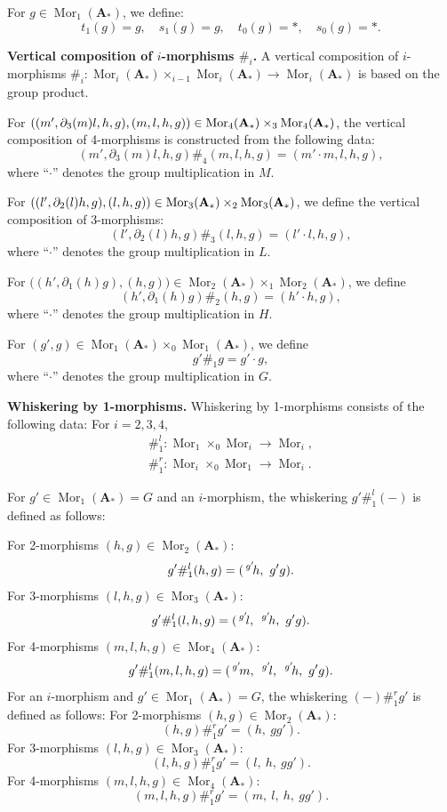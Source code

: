 \documentclass[11pt, reqno]{amsart} %
\newcommand{\act}[1]{\,\sp{#1}\!}
\newcommand{\mor}{{\mathop{\mathrm{Mor}}}}
\theoremstyle{definition}
\theoremstyle{remark}
\numberwithin{equation}{section}
\begin{document}
For $g \in \mor_1(\mathbf{A}_*)$, we define:
\begin{equation*}
t_1(g) = g, \quad s_1(g) = g, \quad t_0(g) = *, \quad s_0(g) = *.
\end{equation*}

\vspace{.5em}
\noindent
{\bf Vertical composition of $i$-morphisms $\#_i$.}
 A vertical composition of $i$-morphisms $\#_i : \mor_i(\mathbf{A}_*)\allowbreak \times_{i-1} \mor_i(\mathbf{A}_*)  \rightarrow \mor_i(\mathbf{A}_*) $ is based on the group product.

For $ \left( (m', \partial_3(m) l,h,g) , (m,l,h,g) \right) \in \mor_4({\bf A_*}) \times_3 \mor_4({\bf A_*})$, the vertical composition of 4-morphisms is constructed from the following data:
\[
(m', \partial_3(m) l,h,g) \#_4 (m,l,h,g) = (m' \cdot m,l,h,g),
\]
where ``$\cdot$'' denotes the group multiplication in $M$.

For $ \left( ( l',\partial_2(l)h,g) , (l,h,g) \right) \in \mor_3({\bf A_*}) \times_2 \mor_3({\bf A_*})$, we define the vertical composition of 3-morphisms:
\[
( l',\partial_2(l)h,g) \#_3 ( l,h,g) = (l'\cdot l,h,g),
\]
where ``$\cdot$'' denotes the group multiplication in $L$.

For $\big((h', \partial_1(h)g), (h, g)\big) \in \mor_2(\mathbf{A_*}) \times_1 \mor_2(\mathbf{A_*})$, we define
\[
(h', \partial_1(h)g) \#_2 (h, g) = (h' \cdot h, g),
\]
where ``$\cdot$'' denotes the group multiplication in $H$.

For $(g', g) \in \mor_1(\mathbf{A_*}) \times_0 \mor_1(\mathbf{A_*})$, we define
\[
g' \#_1 g = g' \cdot g,
\]
where ``$\cdot$'' denotes the group multiplication in $G$.

\vspace{.5em}
\noindent
{\bf Whiskering by 1-morphisms.}
Whiskering by 1-morphisms consists of the following data:
For $i = 2,3,4$,
\begin{equation*}
\begin{aligned}
\#^l_1: \mor_1 \times_0 \mor_i \rightarrow \mor_i,\\
\#^r_1: \mor_i \times_0 \mor_1 \rightarrow \mor_i.
\end{aligned}
\end{equation*}

For $g' \in \mor_1(\mathbf{A_*}) = G$ and an $i$-morphism, the whiskering $g' \#^l_1 (-)$ is defined as follows:

For 2-morphisms $(h, g) \in \mor_2(\mathbf{A_*})$:
$$
g' \#^l_1 (h, g) = (\act{g'}{}{h},\ g'g).
$$
For 3-morphisms $(l, h, g) \in \mor_3(\mathbf{A_*})$:
$$
g' \#^l_1 (l, h, g) = (\act{g'}{}{l},\ \act{g'}{}{h},\ g'g).
$$
For 4-morphisms $(m, l, h, g) \in \mor_4(\mathbf{A_*})$:
$$
g' \#^l_1 (m, l, h, g) = (\act{g'}{}{m},\ \act{g'}{}{l},\ \act{g'}{}{h},\ g'g).
$$
For an $i$-morphism and $g' \in \mor_1(\mathbf{A_*}) = G$, the whiskering $(-) \#^r_1 g'$ is defined as follows:
For 2-morphisms $(h, g) \in \mor_2(\mathbf{A_*})$:
$$
(h, g) \#^r_1 g' = (h,\ gg').
$$
For 3-morphisms $(l, h, g) \in \mor_3(\mathbf{A_*})$:
$$
(l, h, g) \#^r_1 g' = (l,\ h,\ gg').
$$
For 4-morphisms $(m, l, h, g) \in \mor_4(\mathbf{A_*})$:
$$
(m, l, h, g) \#^r_1 g' = (m,\ l,\ h,\ gg').
$$
\end{document}
